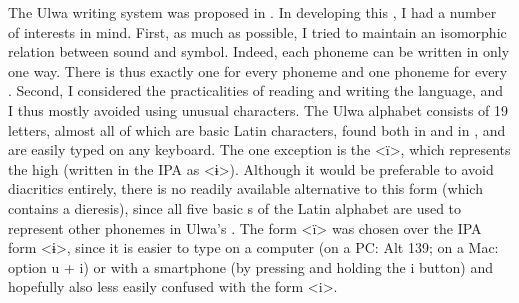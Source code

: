 The Ulwa writing system was proposed in \citet{Barlow2018a}. In developing this , I had a number of interests in mind. First, as much as possible, I tried to maintain an isomorphic relation between sound and symbol. Indeed, each phoneme can be written in only one way. There is thus exactly one  for every phoneme and one phoneme for every . Second, I considered the practicalities of reading and writing the language, and I thus mostly avoided using unusual characters. The Ulwa alphabet consists of 19 letters, almost all of which are basic Latin characters, found both in  and in , and are easily typed on any keyboard. The one exception is the  <ï>, which represents the  high  (written in the IPA as <ɨ>). Although it would be preferable to avoid diacritics entirely, there is no readily available alternative to this form (which contains a dieresis), since all five basic s of the Latin alphabet are used to represent other phonemes in Ulwa’s . The form <ï> was chosen over the IPA form <ɨ>, since it is easier to type on a computer (on a PC: Alt 139; on a Mac: option u + i) or with a smartphone (by pressing and holding the i button) and hopefully also less easily confused with the form <i>.

